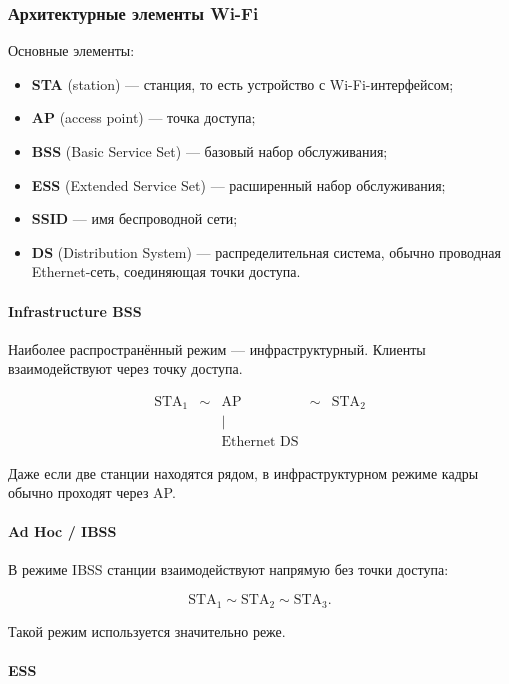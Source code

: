 \documentclass[12pt,a4paper]{article}
\begin{document}
\subsubsection{Архитектурные элементы Wi-Fi}

Основные элементы:
\begin{itemize}
    \item \textbf{STA} (station) --- станция, то есть устройство с Wi-Fi-интерфейсом;
    \item \textbf{AP} (access point) --- точка доступа;
    \item \textbf{BSS} (Basic Service Set) --- базовый набор обслуживания;
    \item \textbf{ESS} (Extended Service Set) --- расширенный набор обслуживания;
    \item \textbf{SSID} --- имя беспроводной сети;
    \item \textbf{DS} (Distribution System) --- распределительная система, обычно проводная Ethernet-сеть, соединяющая точки доступа.
\end{itemize}

\paragraph{Infrastructure BSS}

Наиболее распространённый режим --- инфраструктурный. Клиенты взаимодействуют через точку доступа.

\[
\begin{array}{ccccc}
\text{STA}_1 & \sim & \text{AP} & \sim & \text{STA}_2 \\
 & & | & & \\
 & & \text{Ethernet DS} & &
\end{array}
\]

Даже если две станции находятся рядом, в инфраструктурном режиме кадры обычно проходят через AP.

\paragraph{Ad Hoc / IBSS}

В режиме IBSS станции взаимодействуют напрямую без точки доступа:

\[
\text{STA}_1 \sim \text{STA}_2 \sim \text{STA}_3.
\]

Такой режим используется значительно реже.

\paragraph{ESS}
\end{document}
